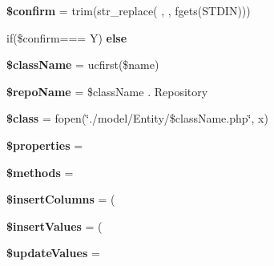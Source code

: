 \begin{DoxyCompactItemize}
\item 
{\bfseries \$confirm} = trim(str\+\_\+replace(\textquotesingle{} \textquotesingle{}, \textquotesingle{}\textquotesingle{}, fgets(S\+T\+D\+IN)))\hypertarget{table-generator_8php_a4dcadbee89ed4c8ead497ce14b67dd23}{}\label{table-generator_8php_a4dcadbee89ed4c8ead497ce14b67dd23}

\item 
if(\$confirm=== \textquotesingle{}Y\textquotesingle{}) {\bfseries else}
\item 
{\bfseries \$class\+Name} = ucfirst(\$name)\hypertarget{table-generator_8php_acd6a475a6eeb092f4eea3e19e502d67d}{}\label{table-generator_8php_acd6a475a6eeb092f4eea3e19e502d67d}

\item 
{\bfseries \$repo\+Name} = \$class\+Name . \textquotesingle{}Repository\textquotesingle{}\hypertarget{table-generator_8php_a10d32c8d09d7e0c815d4d4335d860285}{}\label{table-generator_8php_a10d32c8d09d7e0c815d4d4335d860285}

\item 
{\bfseries \$class} = fopen(\char`\"{}./model/Entity/\$class\+Name.\+php\char`\"{}, \textquotesingle{}x\textquotesingle{})\hypertarget{table-generator_8php_a252ba022809910ea710a068fc1bab657}{}\label{table-generator_8php_a252ba022809910ea710a068fc1bab657}

\item 
{\bfseries \$properties} = \textquotesingle{}\textquotesingle{}\hypertarget{table-generator_8php_a7f675de4b5983d7e84f6573b7d4d453d}{}\label{table-generator_8php_a7f675de4b5983d7e84f6573b7d4d453d}

\item 
{\bfseries \$methods} = \textquotesingle{}\textquotesingle{}\hypertarget{table-generator_8php_a802753499268a04da139bd6e6ef89b35}{}\label{table-generator_8php_a802753499268a04da139bd6e6ef89b35}

\item 
{\bfseries \$insert\+Columns} = \textquotesingle{}(\textquotesingle{}\hypertarget{table-generator_8php_a7aa7d5d1dd8a405aeb1673e4fc00b827}{}\label{table-generator_8php_a7aa7d5d1dd8a405aeb1673e4fc00b827}

\item 
{\bfseries \$insert\+Values} = \textquotesingle{}(\textquotesingle{}\hypertarget{table-generator_8php_a8af84c8ac6fb500f53a33a89f7fb2cc6}{}\label{table-generator_8php_a8af84c8ac6fb500f53a33a89f7fb2cc6}

\item 
{\bfseries \$update\+Values} = \textquotesingle{}\textquotesingle{}\hypertarget{table-generator_8php_a51215fd925a38c81c5fe6d15ccb48c5c}{}\label{table-generator_8php_a51215fd925a38c81c5fe6d15ccb48c5c}


\end{DoxyCompactItemize}
